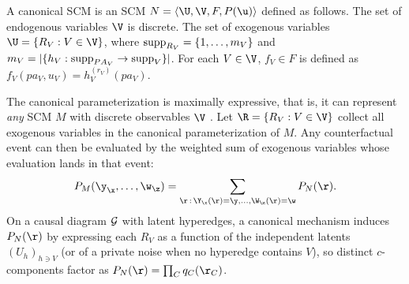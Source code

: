 \begin{definition}
    \label{def:canonical_scm}
    A canonical SCM is an SCM $N=\langle \U, \V, F,P(\u)\rangle$ defined as follows. The set of endogenous variables $\V$ is discrete. The set of exogenous variables $\U =\{R_V : V \in\V \}$, where $\mathrm{supp}_{R_V} = \{1, \dots , m_V\}$ and $m_V = |\{h_V : \mathrm{supp}_{PA_V} \to \mathrm{supp}_V \}|$. For each $V\in\V$, $f_V\in F$ is defined as $f_V(pa_V, u_V) = h_V^{(r_V)}(pa_V)$.
\end{definition}

The canonical parameterization is maximally expressive, that is, it can represent \emph{any} SCM $M$ with discrete observables $\V$ \citep[Thm. 2.4]{zhang2022partial}. Let $\R=\{R_V:V\in\V\}$ collect all exogenous variables in the canonical parameterization of $M$. Any counterfactual event can then be evaluated by the weighted sum of exogenous variables whose evaluation lands in that event:
\begin{equation}
  \label{eq:counterfactual_event_probability}
  P_M(\y_\x, \dots,  \w_\z) = \sum_{\r\,:\,\Y_\x(\r) = \y, \dots,  \W_\z(\r) = \w } P_N(\r).
\end{equation}
On a causal diagram $\mathcal{G}$ with latent hyperedges, a canonical mechanism induces $P_N(\r)$ by expressing each $R_V$ as a function of the independent latents $(U_h)_{h\ni V}$ (or of a private noise when no hyperedge contains $V$), so distinct $c$-components factor as $P_N(\r)=\prod_C q_C(\r_C)$.

